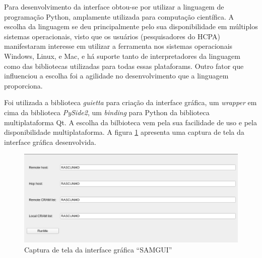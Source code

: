 \documentclass[cic,tc]{iiufrgs}
\begin{document}
Para desenvolvimento da interface obtou-se por utilizar a linguagem de
programação Python, amplamente utilizada para computação
científica.\cite{oliphant2007python} A escolha da linguagem se deu
principalmente pelo sua disponibilidade em múltiplos sistemas operacionais,
visto que os usuários (pesquisadores do HCPA) manifestaram interesse em
utilizar a ferramenta nos sistemas operacionais Windows, Linux, e Mac, e há
suporte tanto de interpretadores da linguagem como das bibliotecas utilizadas
para todas essas plataforams.\cite{oliphant2007python} Outro fator que
influenciou a escolha foi a agilidade no desenvolvimento que a linguagem
proporciona.\cite{oliphant2007python}

Foi utilizada a biblioteca \textit{guietta} para criação da interface
gráfica,\cite{guietta} um \textit{wrapper} em cima da biblioteca
\textit{PySide2}, um \textit{binding} para Python da biblioteca multiplataforma
Qt.\cite{loganathan2013pyside} A escolha da bilbioteca vem pela sua facilidade
de uso e pela disponibilidade multiplataforma. A figura \ref{fig:samgui}
apresenta uma captura de tela da interface gráfica desenvolvida.

\begin{figure}
  \caption{Captura de tela da interface gráfica ``SAMGUI''}
    \begin{center}
      \includegraphics[width=0.85\linewidth]{img/samgui.png}
    \end{center}
    \label{fig:samgui}
\end{figure}



\end{document}
